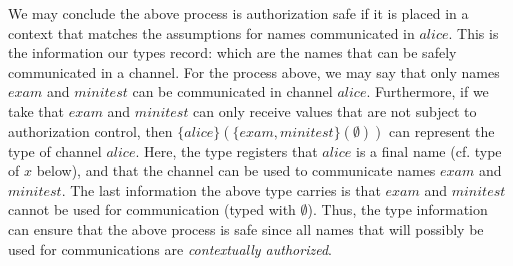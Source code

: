 We may conclude the above process is authorization safe if it is 
placed in a context that matches the assumptions for names communicated in $\mathit{alice}$. 
This is the information our types record: which are the names that can be safely communicated in a channel. 
For the process above, we may say that only names $\mathit{exam}$ and $\mathit{minitest}$ 
can be communicated in channel $\mathit{alice}$. Furthermore, 
if we take that %
$\mathit{exam}$ and $\mathit{minitest}$
can only receive values that are not subject to authorization control,  then 
 $ \{\mathit{alice}\}( \{\mathit{exam},\mathit{minitest}\} ( \emptyset ))$ can represent the type of channel
$\mathit{alice}$. Here, the type registers that $\mathit{alice}$ is a final name (cf. type of $x$ below), and
that the channel can be used to communicate names $\mathit{exam}$ and $\mathit{minitest}$. The last information the above type carries is that $\mathit{exam}$ and $\mathit{minitest}$
cannot be used for communication (typed with $\emptyset$). 
Thus, the type
information 
can ensure that the above process is safe since all names
that will possibly be used for communications are \emph{contextually authorized}. 

